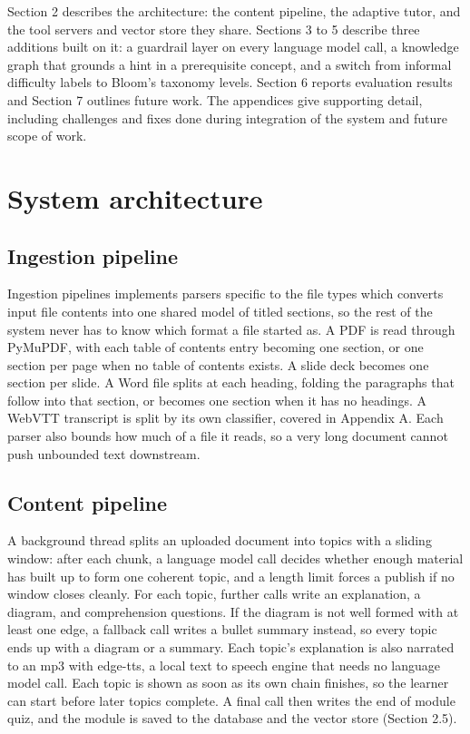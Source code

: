 \documentclass{ecai}
\begin{document}
Section 2 describes the architecture: the content pipeline, the adaptive tutor,
and the tool servers and vector store they share. Sections 3 to 5 describe three
additions built on it: a guardrail layer on every language model call, a
knowledge graph that grounds a hint in a prerequisite concept, and a switch from
informal difficulty labels to Bloom's taxonomy levels. Section 6 reports
evaluation results and Section 7 outlines future work. The appendices give
supporting detail, including challenges and fixes done during integration of
the system and future scope of work.

\section{System architecture}

\subsection{Ingestion pipeline}

Ingestion pipelines implements parsers specific to the
file types which  converts input file contents  into one shared model of 
titled sections, so the rest of the system never has to know which format 
a file started as. A PDF is read through PyMuPDF, with each table of contents
entry becoming one section, or one section per page when no table of contents
exists. A slide deck becomes one section per slide. A Word file splits at each 
heading, folding the paragraphs that follow into that section, or becomes one 
section when it has no headings. A WebVTT transcript is split by its own classifier, 
covered in Appendix A. Each parser also bounds how much of a file it reads, 
so a very long document cannot push unbounded text downstream.

\subsection{Content pipeline}

A background thread splits an uploaded document into topics with a sliding
window: after each chunk, a language model call decides whether enough material
has built up to form one coherent topic, and a length limit forces a publish if
no window closes cleanly. For each topic, further calls write an explanation, a
diagram, and comprehension questions. If the diagram is not well formed with at
least one edge, a fallback call writes a bullet summary instead, so every topic
ends up with a diagram or a summary. Each topic's explanation is also narrated to
an mp3 with edge-tts, a local text to speech engine that needs no language model
call. Each topic is shown as soon as its own chain
finishes, so the learner can start before later topics complete. A final call
then writes the end of module quiz, and the module is saved to the database and
the vector store (Section 2.5).
\end{document}
